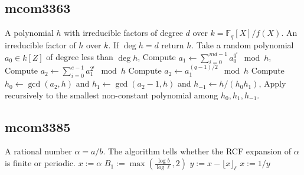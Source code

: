 \documentclass{amsart}
\begin{document}
\subsection{mcom3363}

	\begin{algorithmic}[1]
		\REQUIRE A polynomial $h$  with irreducible factors of degree $d$ over $k=\mathbb{F}_q[X]/f(X)$.
		\ENSURE An irreducible factor of $h$ over $k$.
		\STATE If $\deg h = d$ return $h$.
		\STATE Take a random polynomial $a_0\in k[Z]$ of degree less than $\deg h$,
		\STATE\label{alg:ks-pseudotrace} Compute $a_1
		\leftarrow \sum_{i=0}^{md-1} a_0^{q^i} \mod h$,
		\STATE\label{alg:ks:even} Compute $a_2 \leftarrow
		\sum_{i=0}^{e-1} a_1^{2^i}\mod h$
		\ELSE
		\STATE\label{alg:ks:odd} Compute $a_2 \leftarrow a_1^{(q-1)/2}\mod h$
		\ENDIF
		\STATE\label{alg:ks:gcd} Compute $h_0\leftarrow\gcd(a_2,h)$ and
		$h_1\leftarrow\gcd(a_2-1,h)$ and $h_{-1}\leftarrow h/(h_0h_1)$,
		\STATE Apply recursively to the smallest non-constant polynomial among
		$h_0,h_1,h_{-1}$.
	\end{algorithmic}



\subsection{mcom3385}

\makeatletter
\ALC@noendtrue
\makeatother

  \begin{algorithmic}[1]
    \REQUIRE A rational number $\alpha=a/b$.
    \ENSURE The algorithm tells whether the RCF expansion of $\alpha$ is finite or periodic.
    \STATE $x:=\alpha$
    \STATE $B_1:=\max\left(\frac{\log b}{\log\ell},2\right)$
        \ENDIF
        \STATE $y:=x-\lfloor x\rfloor_\ell$
        \ENDIF
        \STATE $x:=1/y$
    \ENDFOR
   \end{algorithmic}
\end{document}
